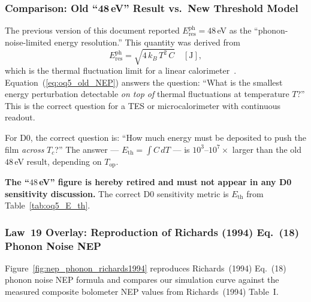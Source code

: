 \subsubsection{Comparison: Old ``48\,eV'' Result vs.\ New Threshold Model}

The previous version of this document reported
$E_\mathrm{res}^\mathrm{ph} = 48$\,eV as the ``phonon-noise-limited
energy resolution.'' This quantity was derived from
\begin{equation}
  E_\mathrm{res}^\mathrm{ph}
  = \sqrt{4\,k_B\,T^2\,C}
  \quad [\text{J}],
  \label{eq:oq5_old_NEP}
\end{equation}
which is the thermal fluctuation limit for a linear
calorimeter~\cite{Richards1994}. %
Equation~(\ref{eq:oq5_old_NEP}) answers the question: ``What is the smallest
energy perturbation detectable \emph{on top of} thermal fluctuations at
temperature $T$?'' This is the correct question for a TES or microcalorimeter
with continuous readout.

For D0, the correct question is: ``How much energy must be deposited to push
the film \emph{across} $T_c$?'' The answer ---
$E_\mathrm{th} = \int C\,dT$ --- is $10^3$--$10^7\times$ larger than the
old $48$\,eV result, depending on $T_\mathrm{op}$.

\textbf{The ``$48$\,eV'' figure is hereby retired and must not appear
in any D0 sensitivity discussion.} The correct D0 sensitivity metric is
$E_\mathrm{th}$ from Table~\ref{tab:oq5_E_th}.

\subsubsection{Law~19 Overlay: Reproduction of Richards (1994) Eq.~(18) Phonon Noise NEP}
\label{sec:oq5_richards1994_nep_overlay}

Figure~\ref{fig:nep_phonon_richards1994} reproduces Richards~(1994) Eq.~(18)
phonon noise NEP formula and compares our simulation curve against the
measured composite bolometer NEP values from Richards~(1994) Table~I.

